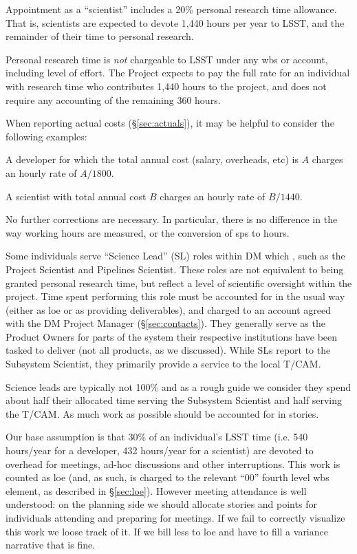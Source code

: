 Appointment as a ``scientist'' includes a 20\% personal research time
allowance. That is, scientists are expected to devote 1,440 hours per
year to LSST, and the remainder of their time to personal research.

Personal research time is \emph{not} chargeable to LSST under any \gls{wbs} or
account, including level of effort. The Project expects to pay the full
rate for an individual with research time who contributes 1,440 hours to
the project, and does not require any accounting of the remaining 360
hours.

When reporting actual costs (\S\ref{sec:actuals}), it may
be helpful to consider the following examples:

A developer for which the total annual cost (salary, overheads, etc) is
\(A\) charges an hourly rate of \(A / 1800\).

A scientist with total annual cost \(B\) charges an hourly rate of
\(B / 1440\).

No further corrections are necessary. In particular, there is no
difference in the way working hours are measured, or the conversion of
\glspl{sp} to hours.

Some individuals serve ``Science Lead'' (SL) roles within DM which ,
such as the Project Scientist and Pipelines Scientist. These roles are
not equivalent to being granted personal research time, but reflect a
level of scientific oversight within the project. Time spent performing
this role must be accounted for in the usual way (either as \gls{loe} or as
providing deliverables), and charged to an account agreed with the
DM Project Manager (\S\ref{sec:contacts}). They generally
serve as the Product Owners for parts of the system their respective
institutions have been tasked to deliver (not all products, as we
discussed). While SLs report to the Subsystem Scientist, they primarily
provide a service to the local T/CAM.

Science leads are typically not 100\% and as a rough guide we consider
they spend about half their allocated time serving the Subsystem
Scientist and half serving the T/CAM. As much work as possible should be
accounted for in stories.

Our base assumption is that 30\% of an individual's LSST time (i.e. 540 hours/year for a developer, 432 hours/year for a scientist) are devoted to overhead for meetings, ad-hoc discussions and other interruptions.
This work is counted as \gls{loe} (and, as such, is charged to the relevant ``00'' fourth level \gls{wbs} \gls{element}, as described in \S\ref{sec:loe}).
However meeting attendance is well understood:  on the planning side we should allocate stories and points for individuals attending and preparing for meetings.
If we fail to correctly visualize this work we loose track of it.
If we bill less to \gls{loe} and have to fill a variance narrative that is fine.

